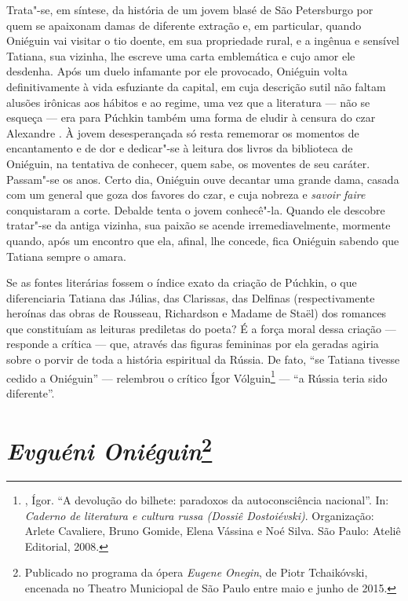 Trata"-se, em síntese, da história de um jovem blasé de São Petersburgo
por quem se apaixonam damas de diferente extração e, em particular,
quando Oniéguin vai visitar o tio doente, em sua propriedade rural, e a
ingênua e sensível Tatiana, sua vizinha, lhe escreve uma carta
emblemática e cujo amor ele desdenha. Após um duelo infamante por ele
provocado, Oniéguin volta definitivamente à vida esfuziante da capital,
em cuja descrição sutil não faltam alusões irônicas aos hábitos e ao
regime, uma vez que a literatura --- não se esqueça --- era para Púchkin
também uma forma de eludir à censura do czar Alexandre . À jovem
desesperançada só resta rememorar os momentos de encantamento e de dor e
dedicar"-se à leitura dos livros da biblioteca de Oniéguin, na tentativa
de conhecer, quem sabe, os moventes de seu caráter. Passam"-se os anos.
Certo dia, Oniéguin ouve decantar uma grande dama, casada com um general
que goza dos favores do czar, e cuja nobreza e \emph{savoir faire} conquistaram
a corte. Debalde tenta o jovem conhecê"-la. Quando ele descobre tratar"-se
da antiga vizinha, sua paixão se acende irremediavelmente, mormente
quando, após um encontro que ela, afinal, lhe concede, fica Oniéguin
sabendo que Tatiana sempre o amara.

Se as fontes literárias fossem o índice exato da criação de Púchkin, o
que diferenciaria Tatiana das Júlias, das Clarissas, das Delfinas
(respectivamente heroínas das obras de Rousseau, Richardson e Madame de
Staël) dos romances que constituíam as leituras prediletas do poeta? É a força
moral dessa criação --- responde a crítica --- que, através das figuras
femininas por ela geradas agiria sobre o porvir de toda a história
espiritual da Rússia. De fato, ``se Tatiana tivesse cedido a Oniéguin'' ---
relembrou o crítico Ígor Vólguin\footnote{, Ígor. ``A devolução do bilhete: paradoxos da
autoconsciência nacional''. In: \emph{Caderno de literatura e cultura russa (Dossiê Dostoiévski)}. Organização: Arlete Cavaliere, Bruno Gomide, Elena Vássina e Noé Silva. São Paulo: Ateliê Editorial, 2008.} --- ``a Rússia teria sido diferente''.

\chapter{\emph{Evguéni Oniéguin}\footnote{Publicado no programa da ópera \emph{Eugene Onegin}, de Piotr Tchaikóvski, encenada no Theatro Municiopal de São Paulo entre maio e junho de 2015.}}

